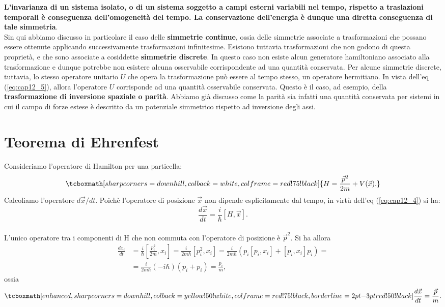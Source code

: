 \textbf{L'invarianza di un sistema isolato, o di un sistema soggetto a campi esterni variabili nel tempo, rispetto a traslazioni temporali è conseguenza dell'omogeneità del tempo. La conservazione dell'energia è dunque una diretta conseguenza di tale simmetria}.\\

Sin qui abbiamo discusso in particolare il caso delle \textbf{simmetrie continue}, ossia delle simmetrie associate a trasformazioni che possano essere ottenute applicando successivamente trasformazioni infinitesime.
Esistono tuttavia trasformazioni che non godono di questa proprietà, e che sono associate a cosiddette \textbf{simmetrie discrete}. In questo caso non esiste alcun generatore hamiltoniano associato alla trasformazione e dunque potrebbe non esistere alcuna osservabile corrispondente ad una quantità conservata. Per alcune simmetrie discrete, tuttavia, lo stesso operatore unitario $U$ che opera la trasformazione può essere al tempo stesso, un operatore hermitiano. In vista dell'eq (\ref{eq:cap12_5}), allora l'operatore $U$ corrisponde ad una quantità osservabile conservata. Questo è il caso, ad esempio, della \textbf{trasformazione di inversione spaziale o parità}. Abbiamo già discusso come la parità sia infatti una quantità conservata per sistemi in cui il campo di forze estese è descritto da un potenziale simmetrico rispetto ad inversione degli assi.

\section[Teorema di Ehrenfest]{Teorema di Ehrenfest}
Consideriamo l'operatore di Hamilton per una particella:
	\begin{equation}
		\tcboxmath[sharp corners=downhill, colback=white, colframe=red!75!black]{
			H= \frac{\vec{p}^2}{2m} + {V}(\vec{x}).
			}
	\end{equation}
Calcoliamo l'operatore $d\vec{x}/dt$. Poichè l'operatore di posizione $\vec{x}$ non dipende esplicitamente dal tempo, in virtù dell'eq (\ref{eq:cap12_4}) si ha:
	\begin{equation}
		\frac{d\vec{x}}{dt}= \frac{i}{\hbar}[H,\vec{x}].
	\end{equation}\\

L'unico operatore tra i componenti di H che non commuta con l'operatore di posizione è $\vec{p}^2$. Si ha allora 
	\begin{align}
		\frac{dx_i}{dt}&=\frac{i}{\hbar} \left[ \frac{p_i^2}{2m},x_i \right]= \frac{i}{2m\hbar}\left[ p_i ^2 ,x_i \right] = \frac{i}{2m\hbar}\left(p_i\left[ p_i, x_i\right]+\left[p_i , x_i \right]p_i\right)= \nonumber \\
		&= \frac{i}{2m\hbar }\left( -i\hbar \right) \left( p_i +p_i \right)=\frac{p_i}{m},
	\end{align}
ossia
	\begin{equation}
   	\label{eq:cap12_6}
		\tcboxmath[enhanced, sharp corners=downhill, colback=yellow!50!white, colframe=red!75!black, borderline={2pt}{-3pt}{red!50!black}]{
			\frac{d\vec{x}}{dt}=\frac{\vec{p}}{m}.
			}
	\end{equation}\\
	
